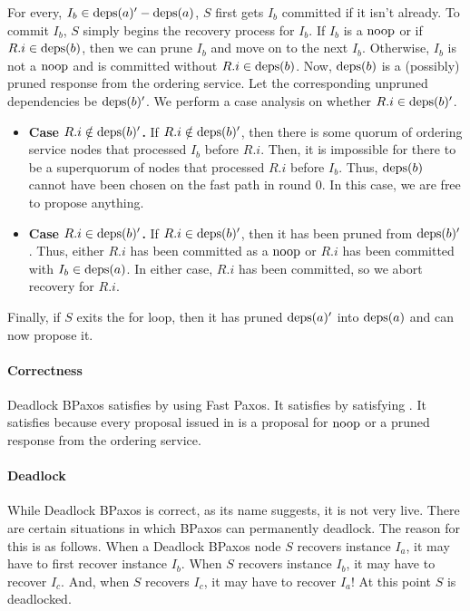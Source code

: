 For every, $I_b \in \text{deps}(a)' - \text{deps}(a)$, $S$ first gets $I_b$ committed if it
isn't already. To commit $I_b$, $S$ simply begins the recovery process for
$I_b$. If $I_b$ is a $\text{noop}$ or if $R.i \in \text{deps}(b)$, then we can prune $I_b$
and move on to the next $I_b$. Otherwise, $I_b$ is not a $\text{noop}$ and is
committed without $R.i \in \text{deps}(b)$. Now, $\text{deps}(b)$ is a (possibly) pruned
response from the ordering service. Let the corresponding unpruned dependencies
be $\text{deps}(b)'$. We perform a case analysis on whether $R.i \in \text{deps}(b)'$.
\begin{itemize}
  \item \textbf{Case $R.i \notin \text{deps}(b)'$.}
    If $R.i \notin \text{deps}(b)'$, then there is some quorum of ordering service
    nodes that processed $I_b$ before $R.i$. Then, it is impossible for there
    to be a superquorum of nodes that processed $R.i$ before $I_b$. Thus,
    $\text{deps}(b)$ cannot have been chosen on the fast path in round $0$. In this
    case, we are free to propose anything.

  \item \textbf{Case $R.i \in \text{deps}(b)'$.}
    If $R.i \in \text{deps}(b)'$, then it has been pruned from $\text{deps}(b)'$. Thus,
    either $R.i$ has been committed as a $\text{noop}$ or $R.i$ has been committed
    with $I_b \in \text{deps}(a)$. In either case, $R.i$ has been committed, so we
    abort recovery for $R.i$.
\end{itemize}

Finally, if $S$ exits the for loop, then it has pruned $\text{deps}(a)'$ into
$\text{deps}(a)$ and can now propose it.

\paragraph{Correctness}
Deadlock BPaxos satisfies  by using Fast Paxos. It
satisfies  by satisfying
. It satisfies  because
every proposal issued in  is a proposal for $\text{noop}$ or
a pruned response from the ordering service.

\paragraph{Deadlock}
While Deadlock BPaxos is correct, as its name suggests, it is not very live.
There are certain situations in which BPaxos can permanently deadlock. The
reason for this is as follows. When a Deadlock BPaxos node $S$ recovers
instance $I_a$, it may have to first recover instance $I_b$. When $S$ recovers
instance $I_b$, it may have to recover $I_c$. And, when $S$ recovers $I_c$, it
may have to recover $I_a$! At this point $S$ is deadlocked.

